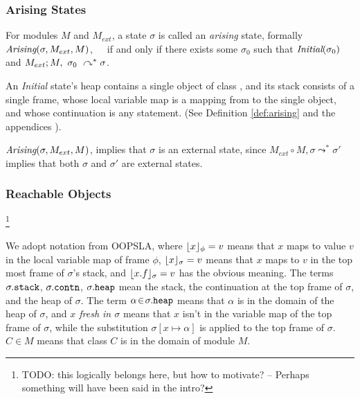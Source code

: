 \subsubsection{Arising States}

\begin{definition}
\label{def:arising}
For   modules $M$ and  $M_{ext}$, a %
 state $\sigma$ is 
called an \emph{arising} state, formally \ \ \ $\textit{Arising}(\sigma, M_{ext}, M)$,\ \ \ 
if and only if there exists some $\sigma_0$ such that $\textit{Initial}(\sigma_0)$ and
$M_{ext} ; M,\ \sigma_0\ \curvearrowright^* \sigma$.
\end{definition}


An \emph{Initial} state's heap contains a single object of class , and
its  stack   consists of a single frame, whose local variable map is a
mapping from \prg{this} to the single object, and whose continuation is  any statement.
(See Definition %
\ref{def:arising} and the 
{appendices %
\cite{necessityFull}).}

$ \textit{Arising}(\sigma, M_{ext}, M)$, implies that $\sigma$ is an external state, since  $M_{ext} \circ M, \sigma  \leadsto^* \sigma' $ implies that both $\sigma$ and $\sigma'$ are external states.


\subsubsection{{Reachable  Objects}}

\footnote{{TODO: this logically belongs here,  but how to motivate? -- Perhaps something will have been said in the intro?}}


We adopt notation from OOPSLA, where
 $\lfloor x \rfloor_{\phi} = v$  means that $x$ maps to
value $v$ in the local variable map of frame $\phi$, $\lfloor x \rfloor_{\sigma} = v$ means that $x$ 
maps to $v$ in the top most frame of $\sigma$'s stack, and $\lfloor x.f \rfloor_{\sigma} = v$
has the obvious meaning. The terms $\sigma.{\texttt{stack}}$,  
$\sigma.{\texttt{contn}}$,  
$\sigma.{\texttt{heap}}$     mean the stack, 
the continuation at the
top frame of $\sigma$, %
and the heap of $\sigma$.
The term $\alpha\!\in\!\sigma.{\texttt{heap}}$ means that $\alpha$ is in the domain of the heap of $\sigma$, and \emph{$x$ fresh in $\sigma$} means that 
$x$ isn't in the variable map of the top frame of $\sigma$, 
while the substitution  $\sigma[x \mapsto \alpha]$ is applied to the top frame of $\sigma$.
 \ $C\in M$ means that class $C$ is in the domain of module $M$. 


